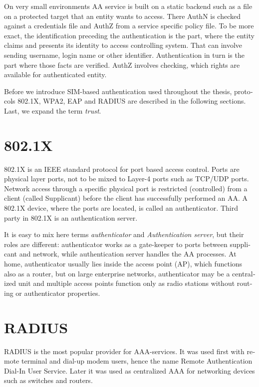 \documentclass[12pt,a4paper,english]{tutthesis}
\begin{document}
\begin{otherlanguage}{english}
On very small environments AA service is built on a static backend such
as a file on a protected target that an entity wants to access. There AuthN
is checked against a credentials file and AuthZ from a service
specific policy file. 
To be more exact, the identification preceding the authentication is the part,
where the entity claims and presents its identity to 
access controlling system. That can involve sending username, login
name or other identifier. Authentication in turn is the part where
those facts are verified. AuthZ involves checking, which rights are 
available for authenticated entity. 


Before we introduce SIM-based authentication used throughout the
thesis, protocols 802.1X, WPA2, EAP and RADIUS are described in the
following sections. Last, we expand the term \emph{trust}.

\section{802.1X}
\label{sec-2-1}

802.1X\cite{8021X} is an IEEE standard protocol for port based access
control. Ports are physical layer ports, not to be mixed to Layer-4 ports such as TCP/UDP ports.
 Network access through a specific physical port is
restricted (controlled) from a client (called Supplicant) before
the client has successfully performed an AA. A 802.1X device, where
the ports are located, is called an authenticator. Third party in 802.1X is an
authentication server. 



It is easy to mix here terms \emph{authenticator} and \emph{Authentication
server}, but their roles are different: authenticator works as a
gate-keeper to ports between supplicant and network, while
authentication server handles the AA processes.
At home, authenticator usually lies inside the access point (AP),
which functions also as a router, but 
on large enterprise networks, authenticator may be a centralized unit 
and multiple access points function only as radio stations without
routing or authenticator properties.



\section{RADIUS}
\label{sec-2-2}
\label{sec:radius}
RADIUS is the most popular provider for 
AAA-services\cite[p.75]{radius-popular}.  It was used first with remote terminal
and dial-up modem users, hence the name Remote Authentication Dial-In
User Service. Later it was used as centralized AAA for networking
devices such as switches and routers.  











\end{otherlanguage}
\end{document}
